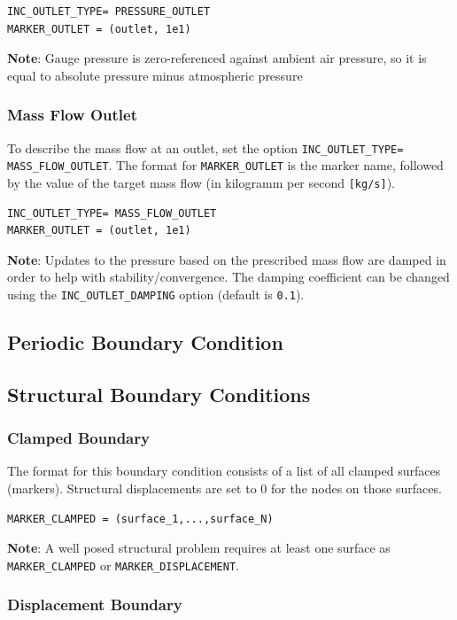 \documentclass{article}
\begin{document}
\begin{lstlisting}
INC_OUTLET_TYPE= PRESSURE_OUTLET
MARKER_OUTLET = (outlet, 1e1)
\end{lstlisting}

\textbf{Note}: Gauge pressure is zero-referenced against ambient air pressure, so it is equal to absolute pressure minus atmospheric pressure

\subsubsection{Mass Flow Outlet}
To describe the mass flow at an outlet, set the option \verb|INC_OUTLET_TYPE= MASS_FLOW_OUTLET|. The format for \verb|MARKER_OUTLET| is the marker name, followed by the value of the target mass flow (in kilogramm per second \verb|[kg/s]|).

\begin{lstlisting}
INC_OUTLET_TYPE= MASS_FLOW_OUTLET
MARKER_OUTLET = (outlet, 1e1)
\end{lstlisting}

\textbf{Note}: Updates to the pressure based on the prescribed mass flow are damped in order to help with stability/convergence. The damping coefficient can be changed using the \verb|INC_OUTLET_DAMPING| option (default is \verb|0.1|).


\subsection{Periodic Boundary Condition}
\subsection{Structural Boundary Conditions}
\subsubsection{Clamped Boundary}
The format for this boundary condition consists of a list of all clamped surfaces (markers). Structural displacements are set to 0 for the nodes on those surfaces.

\begin{lstlisting}
MARKER_CLAMPED = (surface_1,...,surface_N)
\end{lstlisting}

\textbf{Note}: A well posed structural problem requires at least one surface as \verb|MARKER_CLAMPED| or \verb|MARKER_DISPLACEMENT|.

\subsubsection{Displacement Boundary}
\end{document}
